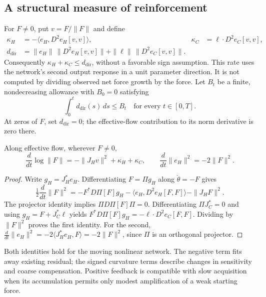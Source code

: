 \subsection{A structural measure of reinforcement}
For $F\ne0$, put $v=F/\|F\|$ and define
\begin{align}
\kappa_H&=-\langle e_H,D^2e_H[v,v]\rangle,
&\kappa_C&=\ell\cdot D^2e_C[v,v],\label{eq:scale-feedback}\\
d_{\mathrm{dir}}&=\|e_H\|\,\|D^2e_H[v,v]\|
+\|\ell\|\,\|D^2e_C[v,v]\|.\label{eq:scale-rate}
\end{align}
Consequently $\kappa_H+\kappa_C\le d_{\mathrm{dir}}$, without a favorable
sign assumption. This rate uses the network's second output response in a
unit parameter direction. It is not computed by dividing observed net force
growth by the force. Let $B_t$ be a finite, nondecreasing allowance with
$B_0=0$ satisfying
\begin{equation}
\int_0^t d_{\mathrm{dir}}(s)\,ds\le B_t
\quad\text{for every }t\in[0,T].
\label{eq:scale-feedback-budget}
\end{equation}
At zeros of $F$, set $d_{\mathrm{dir}}=0$; the effective-flow contribution
to its norm derivative is zero there.

\begin{proposition}
Along effective flow, wherever $F\ne0$,
\begin{equation}
\frac{d}{dt}\log\|F\|=-\|J_Hv\|^2+\kappa_H+\kappa_C,
\qquad
\frac{d}{dt}\|e_H\|^2=-2\|F\|^2.
\label{eq:scale-identities}
\end{equation}
\end{proposition}
\begin{proof}
Write $g_H=J_H^*e_H$. Differentiating $F=\Pi g_H$ along
$\dot\theta=-F$ gives
\begin{equation}
\tfrac12\frac{d}{dt}\|F\|^2
=-F^*D\Pi[F]g_H-\langle e_H,D^2e_H[F,F]\rangle-\|J_HF\|^2.
\end{equation}
The projector identity implies $\Pi D\Pi[F]\Pi=0$. Differentiating
$\Pi J_C^*=0$ and using $g_H=F+J_C^*\ell$ yields
$F^*D\Pi[F]g_H=-\ell\cdot D^2e_C[F,F]$. Dividing by $\|F\|^2$
proves the first identity. For the second,
$\frac{d}{dt}\|e_H\|^2=-2\langle J_H^*e_H,F\rangle=-2\|F\|^2$,
since $\Pi$ is an orthogonal projector.
\end{proof}

Both identities hold for the moving nonlinear network. The negative term
fits away existing residual; the signed curvature terms describe changes
in sensitivity and coarse compensation. Positive feedback is compatible
with slow acquisition when its accumulation permits only modest
amplification of a weak starting force.

